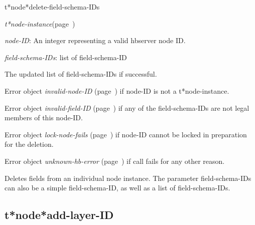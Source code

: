 \begin{description}
\item [Name:]  t*node*delete-field-schema-IDs

\item [Class:] {\sl t*node-instance}\hfill(page~\pageref{t*node-instance})

\item [Parameters:]
\item {\sl node-ID}:   An integer representing
a valid hbserver node ID.

\item {\sl field-schema-IDs}:  list of field-schema-ID


\item [Return-value:]
The updated list of field-schema-IDs if successful.

Error object {\sl invalid-node-ID} (page~\pageref{invalid-node-ID}) if node-ID is not
a t*node-instance.

Error object {\sl invalid-field-ID} (page~\pageref{invalid-field-ID}) if any of the 
field-schema-IDs are not legal members of this
node-ID.

Error object {\sl lock-node-fails} (page~\pageref{lock-node-fails}) if node-ID cannot
be locked in preparation for the deletion. 

Error object {\sl unknown-hb-error} (page~\pageref{unknown-hb-error}) if call fails
for any other reason.

\item [Description:]

Deletes fields from an individual node instance. 
The parameter field-schema-IDs can also be a 
simple field-schema-ID, as well as a list of 
field-schema-IDs.

\item [Public:]



\end{description}
\horizontalline

\subsection{t*node*add-layer-ID}
\label{t*node*add-layer-ID}

